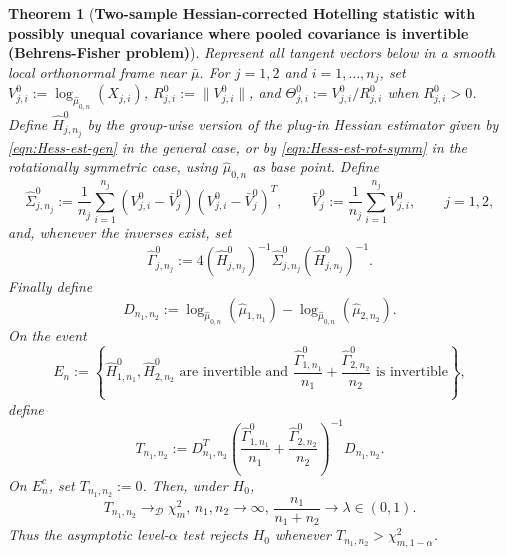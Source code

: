 \documentclass{amsart}
\newtheorem{theorem}{Theorem}[section]
\theoremstyle{definition}
\theoremstyle{remark}
\newcommand\0{\boldsymbol{0}}
\begin{document}
\begin{theorem}[\textbf{Two-sample Hessian-corrected Hotelling statistic with possibly unequal covariance where pooled covariance is invertible (Behrens-Fisher problem)}]
  
Represent all tangent vectors below in a smooth local orthonormal frame near \(\bar\mu\).  For \(j=1,2\) and \(i=1,\dots,n_j\), set \(V^0_{j,i}:=\log_{\hat\mu_{0,n}}(X_{j,i})\), \(R^0_{j,i}:=\|V^0_{j,i}\|\), and \(\Theta^0_{j,i}:=V^0_{j,i}/R^0_{j,i}\) when \(R^0_{j,i}>0\).  Define \(\widehat H^0_{j,n_j}\) by the group-wise version of the plug-in Hessian estimator given by \eqref{eqn:Hess-est-gen} in the general case, or by \eqref{eqn:Hess-est-rot-symm} in the rotationally symmetric case, using \(\hat\mu_{0,n}\) as base point.  Define
\[
\widehat\Sigma^0_{j,n_j}
:=
\frac1{n_j}\sum_{i=1}^{n_j}
(V^{0}_{j,i}-\bar V^0_j)(V^{0}_{j,i}-\bar V^0_j)^T,
\qquad
\bar V^0_j:=\frac1{n_j}\sum_{i=1}^{n_j}V^{0}_{j,i},
\qquad
j=1, 2,
\]
and, whenever the inverses exist, set
\[
\widehat\Gamma^0_{j,n_j}:=
4(\widehat H^0_{j,n_j})^{-1}
\widehat\Sigma^0_{j,n_j}
(\widehat H^0_{j,n_j})^{-1}.
\]
Finally define
\[
D_{n_1,n_2}:=
\log_{\hat\mu_{0,n}}(\hat\mu_{1,n_1})
-
\log_{\hat\mu_{0,n}}(\hat\mu_{2,n_2}).
\]
On the event
\[
E_n:=
\left\{
\widehat H^0_{1,n_1},\widehat H^0_{2,n_2}
\text{ are invertible and }
\frac{\widehat\Gamma^0_{1,n_1}}{n_1}
+
\frac{\widehat\Gamma^0_{2,n_2}}{n_2}
\text{ is invertible}
\right\},
\]
define
\begin{equation}
\label{eqn:two-sample-hotelling-stat}
T_{n_1,n_2}
:=
D_{n_1,n_2}^T
\left(
\frac{\widehat\Gamma^0_{1,n_1}}{n_1}
+
\frac{\widehat\Gamma^0_{2,n_2}}{n_2}
\right)^{-1}
D_{n_1,n_2}.
\end{equation}
On \(E_n^c\), set \(T_{n_1,n_2}:=0\).  Then, under \(H_0\),
\[
T_{n_1,n_2}\rightarrow_{\mathcal D}\chi^2_m,\, n_1, n_2 \to \infty, \, \frac{n_1}{n_1+n_2} \to \lambda \in (0, 1) .
\]
Thus the asymptotic level-\(\alpha\) test rejects \(H_0\) whenever \(T_{n_1,n_2}>\chi^2_{m,1-\alpha}\).
\end{theorem}
\end{document}
